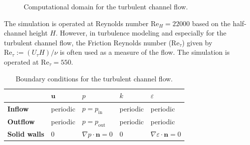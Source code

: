 \begin{figure}[htbp]
    \centering
    \captionsetup{width=0.85\textwidth}
    \caption{Computational domain for the turbulent channel flow.}
    \label{fig: fully developed turbulent channel flow}
\end{figure}

The simulation is operated at Reynolds number \(\text{Re}_H = 22000\) based on the half-channel height \(H\). However, in turbulence modeling and especially for the turbulent channel flow, the Friction Reynolds number (\(\text{Re}_\tau \)) given by \(\text{Re}_\tau := (U_\tau H) / \nu \) is often used as a measure of the flow. The simulation is operated at \(\text{Re}_\tau = 550\). 

\begin{table}
    \centering
    \begin{tabular}{m{2.1cm} m{1.75cm} m{1.75cm} m{1.75cm} m{1.75cm}}
        \hline
        & $\mathbf{u}$ & $p$ & $k$ & $\varepsilon$ \\
        \hline
        \textbf{Inflow} & periodic & $p=p_{\text{in}}$ & periodic & periodic \\
        \textbf{Outflow} & periodic & $p=p_\text{out}$ & periodic & periodic \\
        \textbf{Solid walls} & $0$ & $\nabla p \cdot \mathbf{n} = 0$ & $0$ & $\nabla \varepsilon \cdot \mathbf{n} = 0$ \\
        \hline
    \end{tabular}
    \captionsetup{width=0.85\textwidth}
    \caption{Boundary conditions for the turbulent channel flow.}
    \label{tab: boundary conditions for the channel flow}
\end{table}

